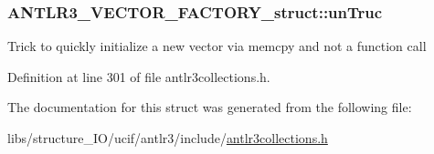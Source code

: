 \hypertarget{struct_a_n_t_l_r3___v_e_c_t_o_r___f_a_c_t_o_r_y__struct_a1e5583a477394c1747c3510bd07fa3b6}{
\subsubsection[{un\-Truc}]{ A\-N\-T\-L\-R3\-\_\-\-V\-E\-C\-T\-O\-R\-\_\-\-F\-A\-C\-T\-O\-R\-Y\-\_\-struct\-::un\-Truc}}\label{struct_a_n_t_l_r3___v_e_c_t_o_r___f_a_c_t_o_r_y__struct_a1e5583a477394c1747c3510bd07fa3b6}
Trick to quickly initialize a new vector via memcpy and not a function call 

Definition at line 301 of file antlr3collections.\-h.



The documentation for this struct was generated from the following file\-:\begin{DoxyCompactItemize}
\item 
libs/structure\-\_\-\-I\-O/ucif/antlr3/include/\hyperlink{antlr3collections_8h}{antlr3collections.\-h}\end{DoxyCompactItemize}
